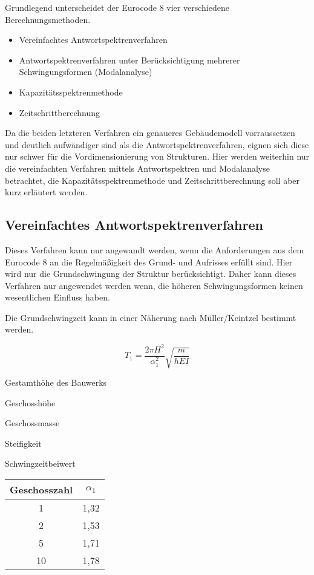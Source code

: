 Grundlegend unterscheidet der Eurocode 8 vier verschiedene Berechnungsmethoden.

\begin{itemize}
  \item Vereinfachtes Antwortspektrenverfahren
  \item Antwortspektrenverfahren unter Berücksichtigung mehrerer Schwingungsformen (Modalanalyse)
  \item Kapazitätsspektrenmethode
  \item Zeitschrittberechnung
\end{itemize}

Da die beiden letzteren Verfahren ein genaueres Gebäudemodell vorraussetzen und deutlich aufwändiger sind als die Antwortspektrenverfahren, eignen sich diese nur schwer für die Vordimensionierung von Strukturen. 
Hier werden weiterhin nur die vereinfachten Verfahren mittels Antwortspektren und Modalanalyse betrachtet, die Kapazitätsspektrenmethode und Zeitschrittberechnung soll aber kurz erläutert werden.

\pagebreak

\subsection{Vereinfachtes Antwortspektrenverfahren}
\label{sec:Antwortspektrenverfahren}

Dieses Verfahren kann nur angewandt werden, wenn die Anforderungen aus dem Eurocode 8 an die Regelmäßigkeit des Grund- und Aufrisses erfüllt sind.
Hier wird nur die Grundschwingung der Struktur berücksichtigt. Daher kann dieses Verfahren nur angewendet werden wenn, die höheren Schwingungsformen keinen wesentlichen Einfluss haben.

Die Grundschwingzeit kann in einer Näherung nach Müller/Keintzel bestimmt werden.

\begin{equation*}
T_1 = \frac{2 \pi H^2}{\alpha_1^2}\sqrt{\frac{m}{hEI}}
\end{equation*}

\thinspace

\begin{multicols}{2}
 Gestamthöhe des Bauwerks \par
{} Geschosshöhe \par
{} Geschossmasse \par
{} Steifigkeit \par 
{} Schwingzeitbeiwert \par
\columnbreak
\begin{flushright}
\begin{tabular}{ |c|c| } 
 \hline
 Geschosszahl & $\alpha_1$ \\
 \hline\hline
 1 & 1,32 \\ 
 2 & 1,53 \\ 
 5 & 1,71 \\ 
 10 & 1,78 \\ 
 \hline
\end{tabular}
\end{flushright}
\end{multicols}

